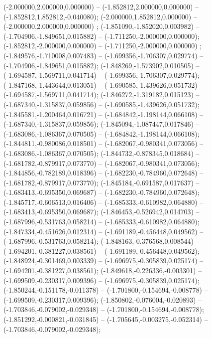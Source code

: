  (-2.000000,2.000000,0.000000) -- (-1.852812,2.000000,0.000000) -- (-1.852812,1.852812,-0.040080);
 (-2.000000,1.852812,0.000000) -- (-2.000000,2.000000,0.000000) ;
 (-1.851090,-1.852020,0.003982) -- (-1.704906,-1.849651,0.015882) -- (-1.711250,-2.000000,0.000000);
 (-1.852812,-2.000000,0.000000) -- (-1.711250,-2.000000,0.000000) ;
 (-1.849576,-1.710008,0.007483) -- (-1.699356,-1.706307,0.029774) -- (-1.704906,-1.849651,0.015882);
 (-1.848269,-1.573902,0.010505) -- (-1.694587,-1.569711,0.041714) -- (-1.699356,-1.706307,0.029774);
 (-1.847168,-1.443644,0.013051) -- (-1.690585,-1.439626,0.051732) -- (-1.694587,-1.569711,0.041714);
 (-1.846272,-1.319182,0.015123) -- (-1.687340,-1.315837,0.059856) -- (-1.690585,-1.439626,0.051732);
 (-1.845581,-1.200464,0.016721) -- (-1.684842,-1.198144,0.066108) -- (-1.687340,-1.315837,0.059856);
 (-1.845094,-1.087447,0.017846) -- (-1.683086,-1.086367,0.070505) -- (-1.684842,-1.198144,0.066108);
 (-1.844811,-0.980086,0.018501) -- (-1.682067,-0.980341,0.073056) -- (-1.683086,-1.086367,0.070505);
 (-1.844732,-0.878345,0.018684) -- (-1.681782,-0.879917,0.073770) -- (-1.682067,-0.980341,0.073056);
 (-1.844856,-0.782189,0.018396) -- (-1.682230,-0.784960,0.072648) -- (-1.681782,-0.879917,0.073770);
 (-1.845184,-0.691587,0.017637) -- (-1.683413,-0.695350,0.069687) -- (-1.682230,-0.784960,0.072648);
 (-1.845717,-0.606513,0.016406) -- (-1.685333,-0.610982,0.064880) -- (-1.683413,-0.695350,0.069687);
 (-1.846453,-0.526942,0.014703) -- (-1.687996,-0.531763,0.058214) -- (-1.685333,-0.610982,0.064880);
 (-1.847334,-0.451626,0.012314) -- (-1.691189,-0.456448,0.049562) -- (-1.687996,-0.531763,0.058214);
 (-1.848163,-0.376568,0.008544) -- (-1.694201,-0.381227,0.038561) -- (-1.691189,-0.456448,0.049562);
 (-1.848924,-0.301469,0.003339) -- (-1.696975,-0.305839,0.025174) -- (-1.694201,-0.381227,0.038561);
 (-1.849618,-0.226336,-0.003301) -- (-1.699509,-0.230317,0.009396) -- (-1.696975,-0.305839,0.025174);
 (-1.850244,-0.151178,-0.011378) -- (-1.701800,-0.154694,-0.008778) -- (-1.699509,-0.230317,0.009396);
 (-1.850802,-0.076004,-0.020893) -- (-1.703846,-0.079002,-0.029348) -- (-1.701800,-0.154694,-0.008778);
 (-1.851292,-0.000821,-0.031845) -- (-1.705645,-0.003275,-0.052314) -- (-1.703846,-0.079002,-0.029348);
